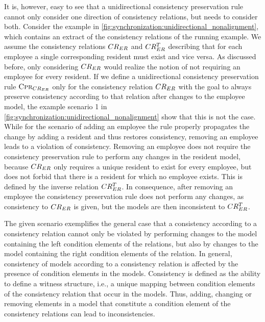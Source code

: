 It is, however, easy to see that a unidirectional consistency preservation rule cannot only consider one direction of consistency relations, but needs to consider both.
Consider the example in \autoref{fig:synchronization:unidirectional_nonalignment}, which contains an extract of the consistency relations of the running example.
We assume the consistency relations $CR_{ER}$ and $CR_{ER}^T$ describing that for each employee a single corresponding resident must exist and vice versa.
As discussed before, only considering $CR_{ER}$ would realize the notion of not requiring an employee for every resident.
If we define a unidirectional consistency preservation rule $\textsc{Cpr}_{CR_{ER}}$ only for the consistency relation $CR_{ER}$ with the goal to always preserve consistency according to that relation after changes to the employee model, the example scenario 1 in \autoref{fig:synchronization:unidirectional_nonalignment} show that this is not the case.
While for the scenario of adding an employee the rule properly propagates the change by adding a resident and thus restores consistency, removing an employee leads to a violation of consistency.
Removing an employee does not require the consistency preservation rule to perform any changes in the resident model, because $CR_{ER}$ only requires a unique resident to exist for every employee, but does not forbid that there is a resident for which no employee exists.
This is defined by the inverse relation $CR_{ER}^T$.
In consequence, after removing an employee the consistency preservation rule does not perform any changes, as consistency to $CR_{ER}$ is given, but the models are then inconsistent to $CR_{ER}^T$.

The given scenario exemplifies the general case that a consistency according to a consistency relation cannot only be violated by performing changes to the model containing the left condition elements of the relations, but also by changes to the model containing the right condition elements of the relation.
In general, consistency of models according to a consistency relation is affected by the presence of condition elements in the models.
Consistency is defined as the ability to define a witness structure, i.e., a unique mapping between condition elements of the consistency relation that occur in the models.
Thus, adding, changing or removing elements in a model that constitute a condition element of the consistency relations can lead to inconsistencies.

